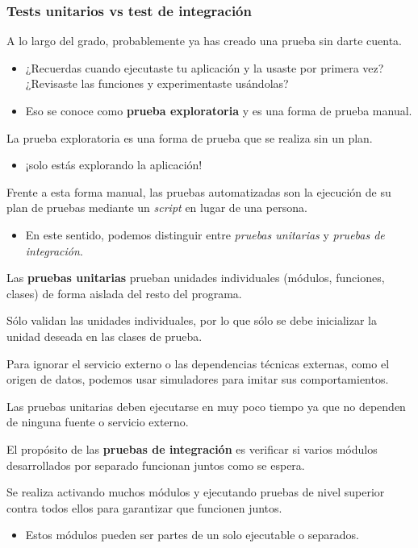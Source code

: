 \subsubsection{Tests unitarios vs test de integración}
A lo largo del grado, probablemente ya has creado una prueba sin darte cuenta. 
\begin{itemize}
\item ¿Recuerdas cuando ejecutaste tu aplicación y la usaste por primera vez? ¿Revisaste las funciones y experimentaste usándolas? 
\item Eso se conoce como \textbf{prueba exploratoria} y es una forma de prueba manual.
\end{itemize}
La prueba exploratoria es una forma de prueba que se realiza sin un plan. 
\begin{itemize}
	\item ¡solo estás explorando la aplicación!
\end{itemize}
Frente a esta forma manual, las pruebas automatizadas son la ejecución de su plan de pruebas mediante un \textit{script} en lugar de una persona.
\begin{itemize}
	\item En este sentido, podemos distinguir entre \textit{pruebas unitarias} y \textit{pruebas de integración}.
\end{itemize}
Las \textbf{pruebas unitarias} prueban unidades individuales (módulos, funciones, clases) de forma aislada del resto del programa.

Sólo validan las unidades individuales, por lo que sólo se debe inicializar la unidad deseada en las clases de prueba. 

Para ignorar el servicio externo o las dependencias técnicas externas, como el origen de datos, podemos usar simuladores para imitar sus comportamientos. 

Las pruebas unitarias deben ejecutarse en muy poco tiempo ya que no dependen de ninguna fuente o servicio externo.

El propósito de las \textbf{pruebas de integración} es verificar si varios módulos desarrollados por separado funcionan juntos como se espera. 

Se realiza activando muchos módulos y ejecutando pruebas de nivel superior contra todos ellos para garantizar que funcionen juntos. 

\begin{itemize}
	\item Estos módulos pueden ser partes de un solo ejecutable o separados.
\end{itemize}

